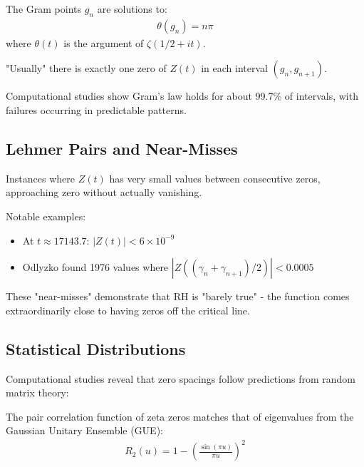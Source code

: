 \begin{definition}
The Gram points $g_n$ are solutions to:
\begin{align}
\theta(g_n) = n\pi
\end{align}
where $\theta(t)$ is the argument of $\zeta(1/2 + it)$.
\end{definition}

\begin{theorem}
"Usually" there is exactly one zero of $Z(t)$ in each interval $(g_n, g_{n+1})$.
\end{theorem}

Computational studies show Gram's law holds for about 99.7\% of intervals, with failures occurring in predictable patterns.

\subsection{Lehmer Pairs and Near-Misses}

\begin{definition}
Instances where $Z(t)$ has very small values between consecutive zeros, approaching zero without actually vanishing.
\end{definition}

Notable examples:
\begin{itemize}
\item At $t \approx 17143.7$: $|Z(t)| < 6 \times 10^{-9}$
\item Odlyzko found 1976 values where $|Z((\gamma_n + \gamma_{n+1})/2)| < 0.0005$
\end{itemize}

\begin{remark}
These "near-misses" demonstrate that RH is "barely true" - the function comes extraordinarily close to having zeros off the critical line.
\end{remark}

\subsection{Statistical Distributions}

Computational studies reveal that zero spacings follow predictions from random matrix theory:

\begin{theorem}
The pair correlation function of zeta zeros matches that of eigenvalues from the Gaussian Unitary Ensemble (GUE):
\begin{align}
R_2(u) = 1 - \left(\frac{\sin(\pi u)}{\pi u}\right)^2
\end{align}
\end{theorem}

